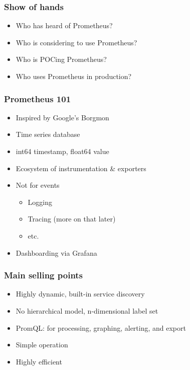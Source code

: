 \documentclass[aspectratio=169]{beamer}
\begin{document}



\begin{frame}
	\frametitle{Show of hands}
	\begin{itemize}
		\item Who has heard of Prometheus?
		\item Who is considering to use Prometheus?
		\item Who is POCing Prometheus?
		\item Who uses Prometheus in production?
	\end{itemize}
\end{frame}

\begin{frame}
	\frametitle{Prometheus 101}
	\begin{itemize}
		\item Inspired by Google's Borgmon
		\item Time series database
		\item int64 timestamp, float64 value
		\item Ecosystem of instrumentation \& exporters
		\item Not for events
		\begin{itemize}
			\item Logging
			\item Tracing (more on that later)
			\item etc.
		\end{itemize}
		\item Dashboarding via Grafana
	\end{itemize}
\end{frame}

\begin{frame}
	\frametitle{Main selling points}
	\begin{itemize}
		\item Highly dynamic, built-in service discovery
		\item No hierarchical model, n-dimensional label set
		\item PromQL: for processing, graphing, alerting, and export
		\item Simple operation
		\item Highly efficient
	\end{itemize}
\end{frame}
\end{document}
